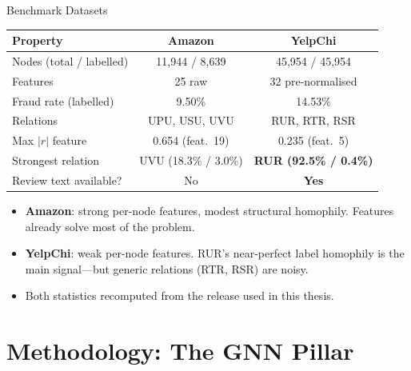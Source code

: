 \documentclass[aspectratio=169,10pt]{beamer}
\begin{document}
\begin{frame}{Benchmark Datasets}
    \begin{center}
    \begin{tabular}{@{}lcc@{}}
        \toprule
        \textbf{Property} & \textbf{Amazon} & \textbf{YelpChi} \\
        \midrule
        Nodes (total / labelled) & 11{,}944 / 8{,}639 & 45{,}954 / 45{,}954 \\
        Features                 & 25 raw            & 32 pre-normalised \\
        Fraud rate (labelled)    & 9.50\%            & 14.53\% \\
        Relations                & UPU, USU, UVU     & RUR, RTR, RSR \\
        Max $|r|$ feature        & 0.654 (feat.\ 19) & 0.235 (feat.\ 5) \\
        Strongest relation       & UVU (18.3\% / 3.0\%) & \textbf{RUR (92.5\% / 0.4\%)} \\
        Review text available?   & No                & \textbf{Yes} \\
        \bottomrule
    \end{tabular}
    \end{center}
    \vspace{0.5em}
    \begin{itemize}\footnotesize
        \item \textbf{Amazon}: strong per-node features, modest structural homophily.
              Features already solve most of the problem.
        \item \textbf{YelpChi}: weak per-node features. RUR's near-perfect label
              homophily is the main signal---but generic relations (RTR, RSR) are noisy.
        \item Both statistics recomputed from the release used in this thesis.
    \end{itemize}
\end{frame}

\section{Methodology: The GNN Pillar}
\end{document}
